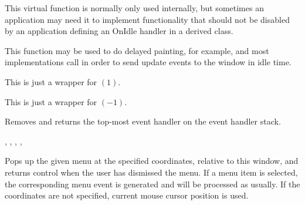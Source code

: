 This virtual function is normally only used internally, but
sometimes an application may need it to implement functionality
that should not be disabled by an application defining an OnIdle
handler in a derived class.

This function may be used to do delayed painting, for example,
and most implementations call 
in order to send update events to the window in idle time.


\label{wxwindowpagedown}

This is just a wrapper for $(1)$.


\label{wxwindowpageup}

This is just a wrapper for $(-1)$.


\label{wxwindowpopeventhandler}


Removes and returns the top-most event handler on the event handler stack.




,\rtfsp
{},\rtfsp
{},\rtfsp
{},\rtfsp
{}\rtfsp


\label{wxwindowpopupmenu}



Pops up the given menu at the specified coordinates, relative to this
window, and returns control when the user has dismissed the menu. If a
menu item is selected, the corresponding menu event is generated and will be
processed as usually. If the coordinates are not specified, current mouse
cursor position is used.

